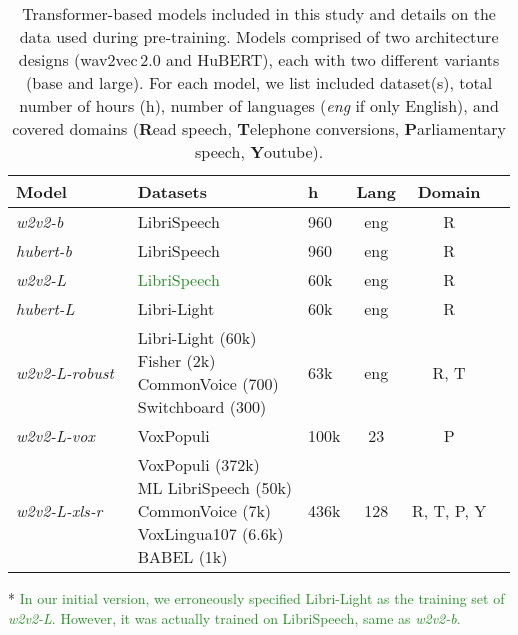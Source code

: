 \documentclass{article}
\newcommand\wbase{\mbox{\emph{w2v2-b}}}
\newcommand\hbase{\mbox{\emph{hubert-b}}}
\newcommand\wlarge{\mbox{\emph{w2v2-L}}}
\newcommand\hlarge{\mbox{\emph{hubert-L}}}
\newcommand\wrobust{\mbox{\emph{w2v2-L-robust}}}
\newcommand\wvox{\mbox{\emph{w2v2-L-vox}}}
\newcommand\wxlsr{\mbox{\emph{w2v2-L-xls-r}}}
\newcommand{\wtov}{wav2vec\,2.0}
\newcommand{\hubert}{HuBERT}
\begin{document}
\begin{table}[t]
    \centering
    \caption{
        Transformer-based models included in this study
        and details on the data used during pre-training.
        Models comprised of two architecture designs ({\wtov} and {\hubert}),
        each with two different variants (base and large).
        For each model, we list included dataset(s),
        total number of hours (h),
        number of languages (\emph{eng} if only English),
        and covered domains
        (\textbf{R}ead speech, \textbf{T}elephone conversions, \textbf{P}arliamentary speech, \textbf{Y}outube).
    }
    \scriptsize
    \begin{threeparttable}
    \begin{tabular}{lllccc}
        \toprule
        \textbf{Model} & \textbf{Datasets} & \textbf{h} & \textbf{Lang} & \textbf{Domain} \\
        \midrule
        \emph{\wbase}~\citep{baevski2020wav2vec} & LibriSpeech & 960 & eng & R \\
        \emph{\hbase}~\citep{hsu2021hubert} & LibriSpeech & 960 & eng & R \\
        \emph{\wlarge}~\citep{baevski2020wav2vec} & \textcolor{ForestGreen}{LibriSpeech}\tnote{*} & 60k & eng & R \\
\emph{\hlarge}~\citep{hsu2021hubert} & Libri-Light & 60k & eng & R \\
        \emph{\wrobust}~\citep{hsu2021robust}  & \makecell[lt]{Libri-Light (60k)\\Fisher (2k)\\CommonVoice (700)\\Switchboard (300)} & 63k     & eng & R, T \\
        \emph{\wvox}~\citep{wang2021voxpopuli} & VoxPopuli & 100k & 23 & P \\
        \emph{\wxlsr}~\citep{babu2021xls-r} & \makecell[lt]{VoxPopuli (372k)\\ ML LibriSpeech (50k)\\CommonVoice (7k)\\ VoxLingua107 (6.6k)\\BABEL (1k)} & 436k & 128 & R, T, P, Y \\
        \bottomrule
    \end{tabular}
    \begin{tablenotes}
            \item[*] \textcolor{ForestGreen}{In our initial version, we erroneously specified Libri-Light as the training set of {\wlarge}. However, it was actually trained on LibriSpeech, same as {\wbase}.}
      \end{tablenotes}
    \end{threeparttable}
    \label{tab:models} 
\end{table}
\end{document}
